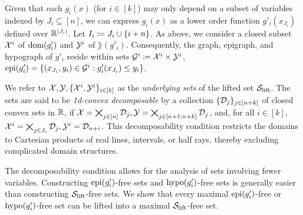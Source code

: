 Given that each $g_i(x)$ (for $i\in[k]$) may only depend on a subset of  variables indexed by $J_i \subseteq [n]$, we can express $g_i(x)$ as a lower order function $g'_i(x_{J_i})$ defined over $\mathbb R^{|J_i|}$. Let $I_i \coloneqq J_i \cup \{i + n\}$. As above, we consider a closed subset $\mathcal X^i$ of $\operatorname{dom}(g'_i)$ and $\mathcal Y^i$ of $\rang(g'_i)$. Consequently, the graph, epigraph, and hypograph of $g'_i$ reside within sets $\mathcal G^i \coloneqq \mathcal X^i \times \mathcal Y^i$, \eg $\operatorname{epi}(g'_i)=\{(x_{J_i}, y_i) \in \mathcal G^i: g'_i(x_{J_i}) \le y_i\}$.

We refer to $\mathcal X,\mathcal Y, \{\mathcal X^i, \mathcal Y^i\}_{i \in [k]}$ as the \emph{underlying sets} of the lifted set $\mathcal S_{\mathrm{lift}}$. The sets are said to be \emph{1d-convex decomposable} by a collection $\{\mathcal D_j \}_{j \in [n+k]}$ of closed  convex sets in $\mathbb R$, if  $\mathcal X= \bigtimes_{j \in [n]}\mathcal D_j, \mathcal Y= \bigtimes_{j \in [n+1:n+k]}\mathcal D_j$, and, for all $i \in [k]$, $\mathcal X^i = \bigtimes_{j \in J_i}\mathcal D_j, \mathcal Y^i = \mathcal D_{n+i}$. This decomposability condition restricts the domains to Cartesian products of real lines, intervals, or half rays, thereby excluding complicated domain structures.

The decomposability condition allows for the analysis of sets involving fewer variables. Constructing $\operatorname{epi}(g'_i)$-free sets and $\operatorname{hypo}(g'_i)$-free sets is generally easier than constructing $\mathcal S_{\mathrm{lift}}$-free sets.  We show that every maximal $\operatorname{epi}(g'_i)$-free or $\operatorname{hypo}(g'_i)$-free set can be lifted into a  maximal $\mathcal S_{\mathrm{lift}}$-free set.

